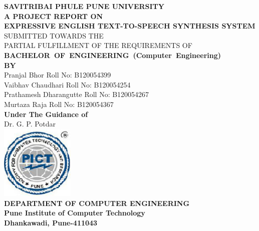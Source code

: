\documentclass[oneside,a4paper,12pt]{book}
\begin{document}
\setlength{\parindent}{0mm}
\begin{center}
{\bfseries SAVITRIBAI PHULE PUNE UNIVERSITY \\}
 \vspace*{1\baselineskip}
{\bfseries A  PROJECT REPORT ON \\}
 \vspace*{2\baselineskip}
{\bfseries \fontsize{16}{16} \selectfont  EXPRESSIVE ENGLISH TEXT-TO-SPEECH SYNTHESIS SYSTEM \\ \vspace*{2\baselineskip}}
{\fontsize{12}{12} \selectfont SUBMITTED TOWARDS THE
 \\PARTIAL FULFILLMENT OF THE REQUIREMENTS OF \\

\vspace*{2\baselineskip}}
{\bfseries \fontsize{14}{12} \selectfont \mbox{BACHELOR OF ENGINEERING (Computer
Engineering)} \\
\vspace*{1\baselineskip}} 
{\bfseries \fontsize{14}{12} \selectfont BY \\ 
\vspace*{1\baselineskip}} 
Pranjal Bhor  \hspace{25 mm} Roll No: B120054399  \\
Vaibhav Chaudhari \hspace{14 mm} Roll No: B120054254   \\
Prathamesh Dharangutte \hspace{3 mm} Roll No: B120054267  \\
Murtaza Raja \hspace{24 mm} Roll No: B120054367\\
\vspace*{2\baselineskip}
{\bfseries \fontsize{14}{12} \selectfont Under The Guidance of \\  
\vspace*{2\baselineskip}} 
Dr. G. P. Potdar\\
\vskip 1cm
\includegraphics[width=100pt]{collegelogo.png} \\
\vskip 0.5cm
{\bfseries \fontsize{14}{12} \selectfont 
DEPARTMENT OF COMPUTER ENGINEERING\\
Pune Institute of Computer Technology \\
Dhankawadi, Pune-411043 
}
\end{center}
\end{document}

